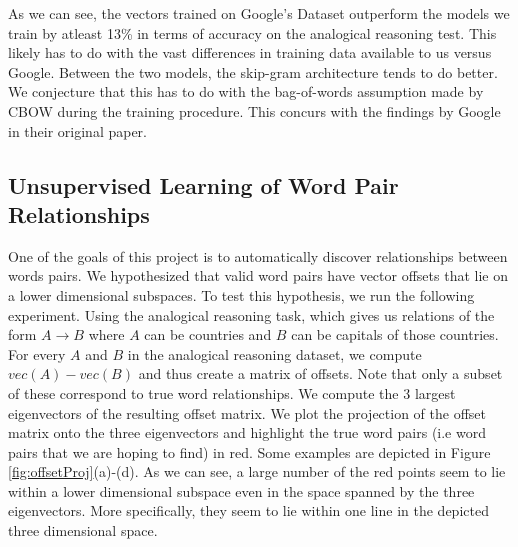 \documentclass[11pt]{article}
\begin{document}
As we can see, the vectors trained on Google's Dataset outperform the models we train by atleast 13\% in terms of accuracy on the analogical reasoning test. This likely has to do with the vast differences in training data available to us versus Google. Between the two models, the skip-gram architecture tends to do better. We conjecture that this has to do with the bag-of-words assumption made by CBOW during the training procedure. This concurs with the findings by Google in their original paper. 

\subsection{Unsupervised Learning of Word Pair Relationships}
One of the goals of this project is to automatically discover relationships between words pairs. We hypothesized that valid word pairs have vector offsets that lie on a lower dimensional subspaces. To test this hypothesis, we run the following experiment. Using the analogical reasoning task, which gives us relations of the form $A\to B$ where $A$ can be countries and $B$ can be capitals of those countries. For every $A$ and $B$ in the analogical reasoning dataset, we compute $vec(A)-vec(B)$ and thus create a matrix of offsets. Note that only a subset of these correspond to true word relationships. We compute the $3$ largest eigenvectors of the resulting offset matrix. We plot the projection of the offset matrix onto the three eigenvectors and highlight the true word pairs (i.e word pairs that we are hoping to find) in red. Some examples are depicted in Figure \ref{fig:offsetProj}(a)-(d). As we can see, a large number of the red points seem to lie within a lower dimensional subspace even in the space spanned by the three eigenvectors. More specifically, they seem to lie within one line in the depicted three dimensional space. 
\end{document}
